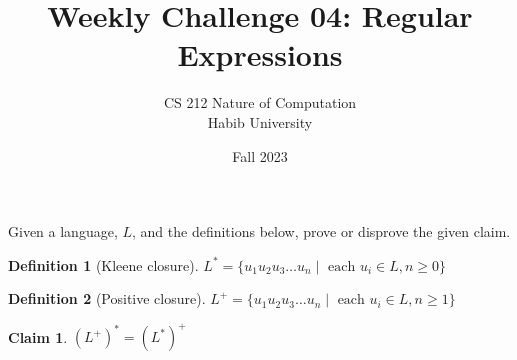 \documentclass[a4paper]{exam}
\title{Weekly Challenge 04: Regular Expressions}
\author{CS 212 Nature of Computation\\Habib University}
\date{Fall 2023}
\theoremstyle{definition}
\newtheorem{definition}{Definition}
\newtheorem{claim}{Claim}
\begin{document}
\maketitle

\begin{questions}


Given a language, $L$, and the definitions below, prove or disprove the given claim.

\begin{definition}[Kleene closure]
  $L^*=\{ u_1u_2u_3\ldots u_n \mid \text{ each }u_i\in L, n\ge 0\}$
\end{definition}
\begin{definition}[Positive closure]
  $L^+=\{ u_1u_2u_3\ldots u_n \mid \text{ each } u_i\in L, n\ge 1\}$
\end{definition}

\begin{claim}
  $(L^+)^*=(L^*)^+$
\end{claim}  


\end{questions}
\end{document}
